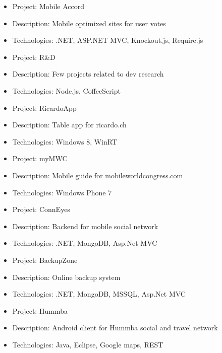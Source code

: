\documentclass{resume}
\begin{document}
\begin{itemize}
  \item Project: Mobile Accord 
  \item Description: Mobile optimixed sites for user votes
  \item Technologies: .NET, ASP.NET MVC, Knockout.js, Require.js
\end{itemize}

\begin{itemize}
  \item Project: R\&D
  \item Description: Few projects related to dev research
  \item Technologies: Node.js, CoffeeScript
\end{itemize}



\begin{itemize}
  \item Project: RicardoApp 
  \item Description: Table app for ricardo.ch 
  \item Technologies: Windows 8, WinRT
\end{itemize}

\begin{itemize}
  \item Project: myMWC 
  \item Description: Mobile guide for mobileworldcongress.com
  \item Technologies: Windows Phone 7
\end{itemize}

\begin{itemize}
  \item Project: ConnEyes 
  \item Description: Backend for mobile social network
  \item Technologies: .NET, MongoDB, Asp.Net MVC
\end{itemize}

\begin{itemize}
  \item Project: BackupZone 
  \item Description: Online backup system
  \item Technologies: .NET, MongoDB, MSSQL, Asp.Net MVC
\end{itemize}

\begin{itemize}
  \item Project: Hummba 
  \item Description: Android client for Hummba social and travel network
  \item Technologies: Java, Eclipse, Google maps, REST
\end{itemize}
\end{document}
